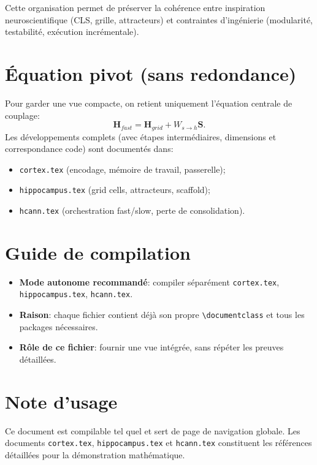\documentclass[12pt,a4paper]{article}
\begin{document}
Cette organisation permet de préserver la cohérence entre inspiration neuroscientifique (CLS, grille, attracteurs) et contraintes d'ingénierie (modularité, testabilité, exécution incrémentale).

\section{Équation pivot (sans redondance)}
Pour garder une vue compacte, on retient uniquement l'équation centrale de couplage:
\[
\mathbf{H}_{fast}=\mathbf{H}_{grid}+W_{s\to h}\mathbf{S}.
\]
Les développements complets (avec étapes intermédiaires, dimensions et correspondance code) sont documentés dans:
\begin{itemize}[leftmargin=*]
    \item \texttt{cortex.tex} (encodage, mémoire de travail, passerelle);
    \item \texttt{hippocampus.tex} (grid cells, attracteurs, scaffold);
    \item \texttt{hcann.tex} (orchestration fast/slow, perte de consolidation).
\end{itemize}

\section{Guide de compilation}
\begin{itemize}[leftmargin=*]
    \item \textbf{Mode autonome recommandé}: compiler séparément
    \texttt{cortex.tex}, \texttt{hippocampus.tex}, \texttt{hcann.tex}.
    \item \textbf{Raison}: chaque fichier contient déjà son propre \texttt{\textbackslash documentclass} et tous les packages nécessaires.
    \item \textbf{Rôle de ce fichier}: fournir une vue intégrée, sans répéter les preuves détaillées.
\end{itemize}

\section*{Note d'usage}
Ce document est compilable tel quel et sert de page de navigation globale.  
Les documents \texttt{cortex.tex}, \texttt{hippocampus.tex} et \texttt{hcann.tex} constituent les références détaillées pour la démonstration mathématique.
\end{document}

